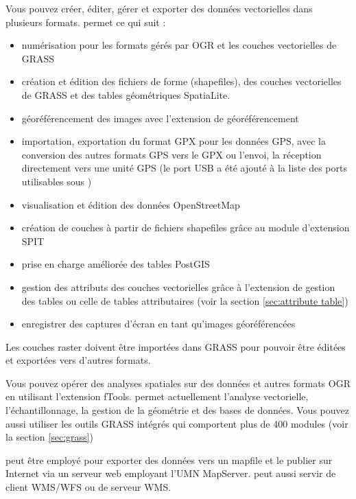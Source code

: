 
Vous pouvez créer, éditer, gérer et exporter des données vectorielles dans 
plusieurs formats. \qg permet ce qui suit :

\begin{itemize}[label=--]
\item numérisation pour les formats gérés par OGR et les couches vectorielles de 
GRASS
\item création et édition des fichiers de forme (shapefiles), des couches 
vectorielles de GRASS et des tables géométriques SpatiaLite.
\item géoréférencement des images avec l'extension de géoréférencement
\item importation, exportation du format GPX pour les données GPS, avec la 
conversion des autres formats GPS vers le GPX ou l'envoi, la réception 
directement vers une unité GPS (le port USB a été ajouté à la liste des ports 
utilisables sous \nix{})
\item visualisation et édition des données OpenStreetMap
\item création de couches \pg à partir de fichiers shapefiles grâce au module 
d'extension SPIT
\item prise en charge améliorée des tables PostGIS
\item gestion des attributs des couches vectorielles grâce à l'extension de 
gestion des tables ou celle de tables attributaires (voir la section 
\ref{sec:attribute table})
\item enregistrer des captures d'écran en tant qu'images géoréférencées
\end{itemize}

Les couches raster doivent être importées dans GRASS pour pouvoir être éditées 
et exportées vers d'autres formats.


Vous pouvez opérer des analyses spatiales sur des données \ppg et autres formats 
OGR en utilisant l'extension fTools. \qg permet actuellement l'analyse 
vectorielle, l'échantillonnage, la gestion de la géométrie et des bases de 
données. Vous pouvez aussi utiliser les outils GRASS intégrés qui comportent 
plus de 400 modules (voir la section \ref{sec:grass})


\qg peut être employé pour exporter des données vers un mapfile et le publier 
sur Internet via un serveur web employant l'UMN MapServer. \qg peut aussi 
servir de client WMS/WFS ou de serveur WMS.

